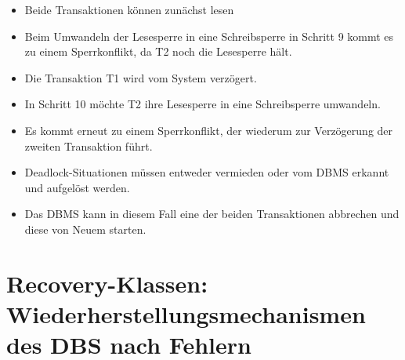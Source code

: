 \documentclass{lehramt-informatik}
\begin{document}
\begin{itemize}
\item Beide Transaktionen können zunächst lesen

\item Beim Umwandeln der Lesesperre in eine Schreibsperre in Schritt 9
kommt es zu einem Sperrkonflikt, da T2 noch die Lesesperre hält.

\item Die Transaktion T1 wird vom System verzögert.

\item In Schritt 10 möchte T2 ihre Lesesperre in eine Schreibsperre
umwandeln.

\item Es kommt erneut zu einem Sperrkonflikt, der wiederum zur
Verzögerung der zweiten Transaktion führt.
\end{itemize}

\begin{itemize}
\item Deadlock-Situationen müssen entweder vermieden oder vom DBMS
erkannt und aufgelöst werden.

\item Das DBMS kann in diesem Fall eine der beiden Transaktionen
abbrechen und diese von Neuem starten.
\end{itemize}

%

\section{Recovery-Klassen: Wiederherstellungsmechanismen des DBS nach
Fehlern}
\end{document}
